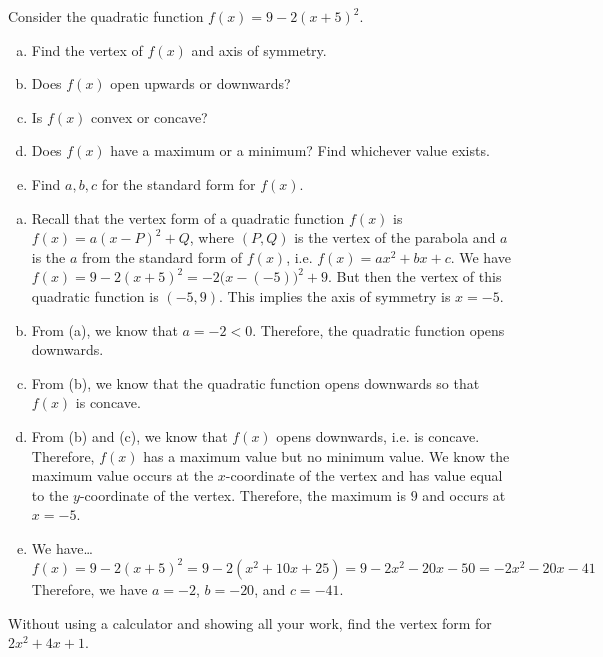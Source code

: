 \documentclass[12pt,letterpaper]{exam}
\begin{document}
\begin{questions}
\newpage
\question[10] Consider the quadratic function $f(x)= 9 - 2(x + 5)^2$.
	\begin{enumerate}[(a)]
	\item Find the vertex of $f(x)$ and axis of symmetry. 
	\item Does $f(x)$ open upwards or downwards?
	\item Is $f(x)$ convex or concave?
	\item Does $f(x)$ have a maximum or a minimum? Find whichever value exists. 
	\item Find $a, b, c$ for the standard form for $f(x)$. 
	\end{enumerate} \pspace

\sol 
\begin{enumerate}[(a)]
\item Recall that the vertex form of a quadratic function $f(x)$ is $f(x)= a (x - P)^2 + Q$, where $(P, Q)$ is the vertex of the parabola and $a$ is the $a$ from the standard form of $f(x)$, i.e. $f(x)= ax^2 + bx + c$. We have $f(x)= 9 - 2(x + 5)^2= -2 \big(x - (-5) \big)^2 + 9$. But then the vertex of this quadratic function is $(-5, 9)$. This implies the axis of symmetry is $x= -5$. \pspace

\item From (a), we know that $a= -2 < 0$. Therefore, the quadratic function opens downwards. \pspace

\item From (b), we know that the quadratic function opens downwards so that $f(x)$ is concave. \pspace

\item From (b) and (c), we know that $f(x)$ opens downwards, i.e. is concave. Therefore, $f(x)$ has a maximum value but no minimum value. We know the maximum value occurs at the $x$-coordinate of the vertex and has value equal to the $y$-coordinate of the vertex. Therefore, the maximum is $9$ and occurs at $x= -5$. \pspace

\item We have\dots
	\[
	f(x)= 9 - 2(x + 5)^2= 9 - 2(x^2 + 10x + 25)= 9 - 2x^2 - 20x - 50= -2x^2 - 20x - 41
	\]
Therefore, we have $a= -2$, $b= -20$, and $c= -41$. 
\end{enumerate}



\newpage
\question[10] Without using a calculator and showing all your work, find the vertex form for $2x^2 + 4x + 1$. \pspace


\end{questions}
\end{document}
